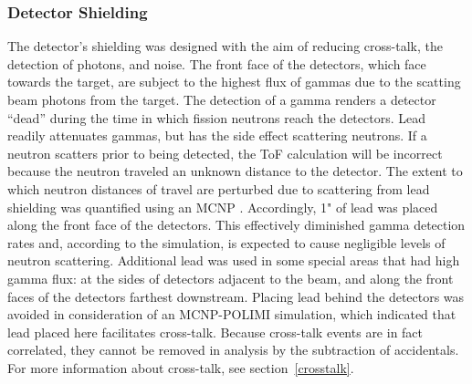 \subsubsection{Detector Shielding}
The detector's shielding was designed with the aim of reducing cross-talk, the detection of photons, and noise.
The front face of the detectors, which face towards the target, are subject to the highest flux of gammas due to the scatting beam photons from the target.
The detection of a gamma renders a detector ``dead'' during the time in which fission neutrons reach the detectors.
Lead readily attenuates gammas, but has the side effect scattering neutrons.
If a neutron scatters prior to being detected, the ToF calculation will be incorrect because the neutron traveled an unknown distance to the detector.
The extent to which neutron distances of travel are perturbed due to scattering from lead shielding was quantified using an MCNP .
Accordingly, 1" of lead was placed along the front face of the detectors.
This effectively diminished gamma detection rates and, according to the simulation, is expected to cause negligible levels of neutron scattering.
Additional lead was used in some special areas that had high gamma flux: at the sides of detectors adjacent to the beam, and along the front faces of the detectors farthest downstream.
Placing lead behind the detectors was avoided in consideration of an MCNP-POLIMI simulation, which indicated that lead placed here facilitates cross-talk.
Because cross-talk events are in fact correlated, they cannot be removed in analysis by the subtraction of accidentals.
For more information about cross-talk, see section~\ref{crosstalk}.

